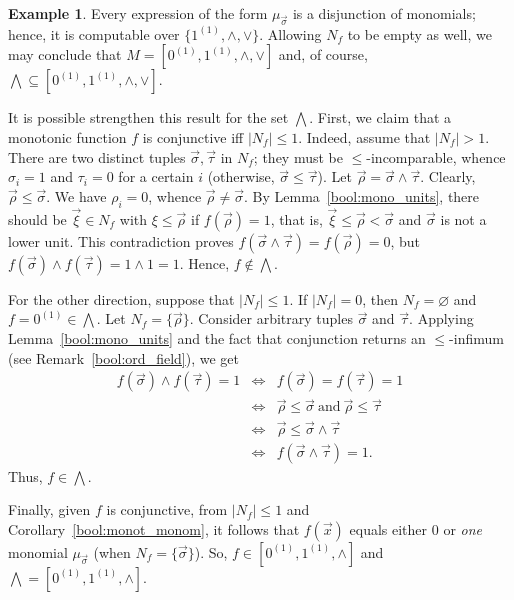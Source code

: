 \documentclass[12pt,notitlepage]{article}
\theoremstyle{plain}
\theoremstyle{definition}
\newtheorem{exm}[thm]{Example}
\theoremstyle{plain}
\newcommand{\sbs}{\subseteq}
\newcommand{\void}{\varnothing}
\newcommand{\1}{\mathbf{1}}
\newcommand{\0}{\mathbf{0}}
\begin{document}
\begin{exm}
Every expression of the form $\mu_{\vec \sigma}$ is a disjunction of monomials; hence, it is computable over $\{1^{(1)}, {\wedge}, {\vee} \}$. Allowing $N_f$ to be empty as well, we may conclude that $M = [0^{(1)}, 1^{(1)}, {\wedge},  {\vee}]$ and, of course, ${\bigwedge} \sbs [0^{(1)}, 1^{(1)}, {\wedge},  {\vee}]$.

It is possible strengthen this result for the set ${\bigwedge}$. First, we claim that a monotonic function $f$ is conjunctive iff $|N_f| \leq 1$. Indeed, assume that $|N_f| > 1$. There are two distinct tuples $\vec{\sigma}, \vec{\tau}$ in $N_f$; they must be ${\leq}$-incomparable, whence $\sigma_i = 1$ and $\tau_i = 0$ for a certain $i$ (otherwise, $\vec \sigma \leq \vec \tau$). Let $\vec \rho = \vec \sigma \wedge \vec \tau$. Clearly, $\vec \rho \leq \vec \sigma$. We have $\rho_i = 0$, whence $\vec \rho \neq \vec \sigma$. By Lemma~\ref{bool:mono_units}, there should be $\vec\xi \in N_f$ with $\xi \leq \vec \rho$ if $f(\vec \rho) = 1$, that is, $\vec \xi \leq \vec \rho < \vec \sigma$ and $\vec \sigma$ is not a lower unit. This contradiction proves $f(\vec \sigma \wedge \vec \tau) = f(\vec \rho) = 0$, but $f(\vec \sigma) \wedge f(\vec \tau) = 1 \wedge 1 = 1$. Hence, $f \notin {\bigwedge}$.

For the other direction, suppose that $|N_f| \leq 1$. If $|N_f| = 0$, then $N_f = \void$ and $f = 0^{(1)} \in {\bigwedge}$. Let $N_f = \{ \vec \rho \}$. Consider arbitrary tuples $\vec \sigma$ and $\vec \tau$. Applying Lemma~\ref{bool:mono_units} and the fact that conjunction returns an ${\leq}$-infimum (see Remark~\ref{bool:ord_field}), we get
$$
\begin{array}{rcl}
f(\vec \sigma) \wedge f(\vec \tau) = 1 &\iff& f(\vec \sigma) = f(\vec \tau) = 1\\
&\iff& \vec \rho \leq \vec \sigma\ \mbox{and}\ \vec \rho \leq \vec \tau\\
&\iff& \vec \rho \leq \vec \sigma \wedge \vec \tau\\
&\iff& f(\vec \sigma \wedge \vec \tau) = 1.
\end{array}
$$
Thus, $f \in {\bigwedge}$.

Finally, given $f$ is conjunctive, from $|N_f| \leq 1$ and Corollary~\ref{bool:monot_monom}, it follows that $f(\vec x)$ equals either $0$ or \emph{one} monomial $\mu_{\vec \sigma}$ (when $N_f = \{\vec \sigma\}$). So, $f \in [0^{(1)}, 1^{(1)}, {\wedge}]$ and ${\bigwedge} = [0^{(1)}, 1^{(1)}, {\wedge}]$.
\end{exm}
\end{document}
